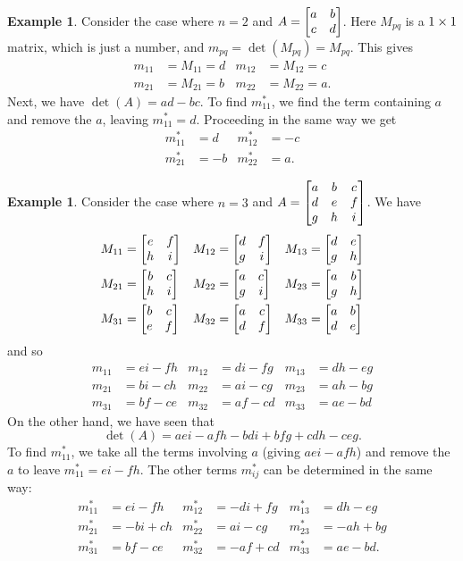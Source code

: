 \documentclass[reqno]{amsart}
\theoremstyle{definition}
\newtheorem{example}[theorem]{Example}
\begin{document}
\begin{example}\label{eg-minors-two}
 Consider the case where $n=2$ and $A=\left[\begin{matrix} a&b\\ c&d\end{matrix}\right]$.  Here
 $M_{pq}$ is a $1\times 1$ matrix, which is just a number, and
 $m_{pq}=\det(M_{pq})=M_{pq}$.  This gives
 \begin{align*}
  m_{11} &= M_{11} = d & m_{12} &= M_{12} = c \\
  m_{21} &= M_{21} = b & m_{22} &= M_{22} = a.
 \end{align*}
 Next, we have $\det(A)=ad-bc$.  To find $m^*_{11}$, we find the term
 containing $a$ and remove the $a$, leaving $m^*_{11}=d$.  Proceeding
 in the same way we get
 \begin{align*}
  m^*_{11} &=  d & m^*_{12} &= -c \\
  m^*_{21} &= -b & m^*_{22} &= a.
 \end{align*}
\end{example}

\begin{example}\label{eg-minors-three}
 Consider the case where $n=3$ and
 $A=\left[\begin{matrix} a&b&c\\
         d&e&f\\
         g&h&i
    \end{matrix}\right]$.
 We have
 \begin{align*}
  M_{11} &= \left[\begin{matrix} e&f\\ h&i\end{matrix}\right] &
  M_{12} &= \left[\begin{matrix} d&f\\ g&i\end{matrix}\right] &
  M_{13} &= \left[\begin{matrix} d&e\\ g&h\end{matrix}\right] \\
  M_{21} &= \left[\begin{matrix} b&c\\ h&i\end{matrix}\right] &
  M_{22} &= \left[\begin{matrix} a&c\\ g&i\end{matrix}\right] &
  M_{23} &= \left[\begin{matrix} a&b\\ g&h\end{matrix}\right] \\
  M_{31} &= \left[\begin{matrix} b&c\\ e&f\end{matrix}\right] &
  M_{32} &= \left[\begin{matrix} a&c\\ d&f\end{matrix}\right] &
  M_{33} &= \left[\begin{matrix} a&b\\ d&e\end{matrix}\right]
 \end{align*}
 and so
 \begin{align*}
  m_{11} &= ei-fh &
  m_{12} &= di-fg &
  m_{13} &= dh-eg \\
  m_{21} &= bi-ch &
  m_{22} &= ai-cg &
  m_{23} &= ah-bg \\
  m_{31} &= bf-ce &
  m_{32} &= af-cd &
  m_{33} &= ae-bd
 \end{align*}
 On the other hand, we have seen that
 \[ \det(A) = aei-afh-bdi+bfg+cdh-ceg . \]
 To find $m^*_{11}$, we take all the terms involving $a$ (giving
 $aei-afh$) and remove the $a$ to leave $m^*_{11}=ei-fh$.  The other
 terms $m^*_{ij}$ can be determined in the same way:
 \begin{align*}
  m^*_{11} &=  ei-fh & m^*_{12} &= -di+fg & m^*_{13} &=  dh-eg \\
  m^*_{21} &= -bi+ch & m^*_{22} &=  ai-cg & m^*_{23} &= -ah+bg \\
  m^*_{31} &=  bf-ce & m^*_{32} &= -af+cd & m^*_{33} &=  ae-bd.
 \end{align*}
\end{example}
\end{document}

